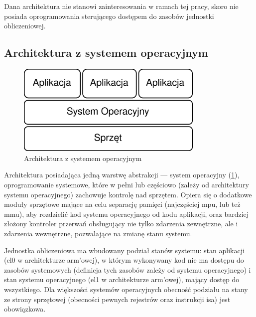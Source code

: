 \documentclass[../../main]{subfiles}
\begin{document}
Dana architektura nie stanowi zainteresowania w ramach tej pracy, skoro nie posiada oprogramowania
sterującego dostępem do zasobów jednostki obliczeniowej.

\subsection{Architektura z systemem operacyjnym}
\begin{figure}[h]
    \centering
    \includegraphics[width=0.8\textwidth]{Images/no-virt.png}
    \caption{Architektura z systemem operacyjnym}
    \label{fig:no-virt}
\end{figure}

Architektura posiadająca jedną warstwę abstrakcji — system operacyjny (\cref{fig:no-virt}),
oprogramowanie systemowe, które w pełni lub częściowo (zależy od architektury systemu operacyjnego)
zachowuje kontrolę nad sprzętem. Opiera się o dodatkowe moduły sprzętowe mające na celu separację
pamięci (najczęściej \acrshort{mpu}, lub też \acrshort{mmu}), aby rozdzielić kod systemu operacyjnego
od kodu aplikacji, oraz bardziej złożony kontroler przerwań obsługujący nie tylko zdarzenia
zewnętrzne, ale i zdarzenia wewnętrzne, pozwalające na zmianę stanu systemu.

Jednostka obliczeniowa ma wbudowany podział stanów systemu: stan aplikacji (\acrshort{el}0 w
architekturze \acrshort{arm}'owej), w którym wykonywany kod nie ma dostępu do zasobów systemowych
(definicja tych zasobów zależy od systemu operacyjnego) i stan systemu operacyjnego (\acrshort{el}1 w
architekturze \acrshort{arm}'owej), mający dostęp do wszystkiego. Dla większości systemów
operacyjnych obecność podziału na stany ze strony sprzętowej (obecności pewnych rejestrów oraz
instrukcji \acrshort{isa}) jest obowiązkowa.
\end{document}
